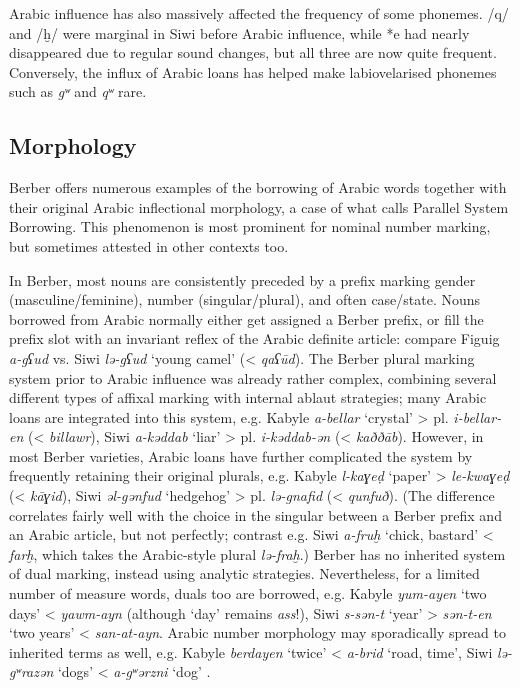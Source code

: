 \documentclass[output=paper]{langsci/langscibook}
\begin{document}
Arabic influence has also massively affected the frequency of some phonemes. /q/ and /ḫ/ were marginal in Siwi before Arabic influence, while *e had nearly disappeared due to regular sound changes, but all three are now quite frequent. Conversely, the influx of Arabic loans has helped make labiovelarised phonemes such as \textit{gʷ} and \textit{qʷ} rare.


 
 \subsection{Morphology} \label{morph}


Berber offers numerous examples of the borrowing of Arabic words together with their original Arabic inflectional morphology, a case of what \citet{Kossmann2010} calls Parallel System Borrowing. This phenomenon is most prominent for nominal number marking, but sometimes attested in other contexts too.

In Berber, most nouns are consistently preceded by a prefix marking gender (masculine/feminine), number (singular/plural), and often case/state. Nouns borrowed from Arabic normally either get assigned a Berber prefix, or fill the prefix slot with an invariant reflex of the Arabic definite article: compare Figuig \textit{a-gʕud} vs. Siwi \textit{lə-gʕud} `young camel' (< \textit{qaʕūd}). The Berber plural marking system prior to Arabic influence was already rather complex, combining several different types of affixal marking with internal ablaut strategies; many Arabic loans are integrated into this system, e.g. Kabyle \textit{a-bellar} `crystal' > pl. \textit{i-bellar-en} (< \textit{billawr}), Siwi \textit{a-kəddab} `liar' > pl. \textit{i-kəddab-ən} (< \textit{kaððāb}). However, in most Berber varieties, Arabic loans have further complicated the system by frequently retaining their original plurals, e.g. Kabyle \textit{l-kaɣeḍ} `paper' > \textit{le-kwaɣeḍ} (< \textit{kāɣid}), Siwi \textit{əl-gənfud} `hedgehog' > pl. \textit{lə-gnafid} (< \textit{qunfuð}). (The difference correlates fairly well with the choice in the singular between a Berber prefix and an Arabic article, but not perfectly; contrast e.g. Siwi \textit{a-fruḫ} `chick, bastard' < \textit{farḫ}, which takes the Arabic-style plural \textit{lə-fraḫ}.)  Berber has no inherited system of dual marking, instead using analytic strategies. Nevertheless, for a limited number of measure words, duals too are borrowed, e.g. Kabyle \textit{yum-ayen} `two days' < \textit{yawm-ayn} (although `day' remains \textit{ass}!), Siwi \textit{s-sən-t} `year' > \textit{sən-t-en} `two years' < \textit{san-at-ayn}.  Arabic number morphology may sporadically spread to inherited terms as well, e.g. Kabyle \textit{berdayen} `twice' < \textit{a-brid} `road, time', Siwi \textit{lə-gʷrazən} `dogs' < \textit{a-gʷərzni} `dog' \citep{Souag2013book}.
\end{document}
